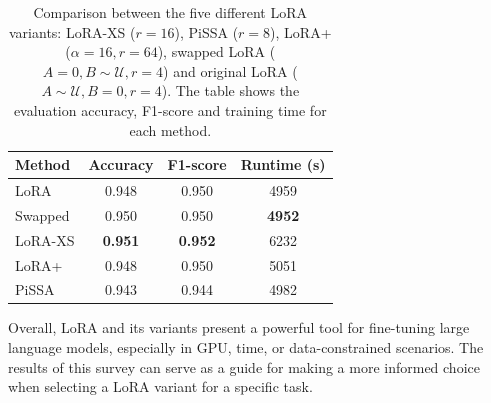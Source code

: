 \documentclass[a4paper,10pt,twocolumn,english]{article}
\begin{document}
\begin{table}[h]
  \centering
  \begin{tabular}{lccc}
    \toprule
    Method & Accuracy & F1-score & Runtime (s) \\
    \midrule
    LoRA & 0.948 & 0.950 & 4959 \\
    Swapped & 0.950 & 0.950 & \textbf{4952} \\
    LoRA-XS & \textbf{0.951} & \textbf{0.952} & 6232 \\
    LoRA+ & 0.948 & 0.950 & 5051 \\
    PiSSA & 0.943 & 0.944 & 4982 \\
    \bottomrule
  \end{tabular}
  \caption{Comparison between the five different LoRA variants: LoRA-XS ($r=16$), PiSSA ($r=8$), LoRA+ ($\alpha=16, r=64$), swapped LoRA ($A=0, B\sim\mathcal{U}, r=4$) and original LoRA ($A\sim\mathcal{U}, B=0, r=4$). The table shows the evaluation accuracy, F1-score and training time for each method.}
  \label{tab:eval_metrics_transposed}
\end{table}

Overall, LoRA and its variants present a powerful tool for fine-tuning large language models, especially in GPU, time, or data-constrained scenarios. The results of this survey can serve as a guide for making a more informed choice when selecting a LoRA variant for a specific task.



\end{document}
